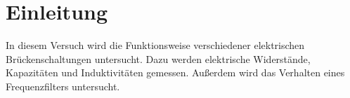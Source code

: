 \section{Einleitung}

In diesem Versuch wird die Funktionsweise verschiedener elektrischen
Brückenschaltungen untersucht. Dazu werden elektrische Widerstände,
Kapazitäten und Induktivitäten gemessen. Außerdem wird das Verhalten
eines Frequenzfilters untersucht.
